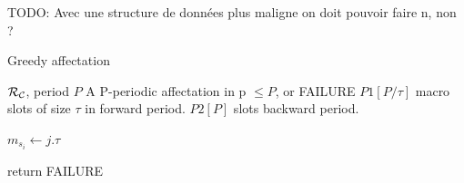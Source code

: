 \documentclass[a4paper,10pt]{article}
\newcommand{\todo}[1]{{\color{red} TODO: {#1}}}
\begin{document}
    \todo{Avec une structure de données plus maligne on doit pouvoir faire n, non ?}
	\begin{algorithm}[H]
	\caption{Greedy affectation}
	\begin{algorithmic}
	\REQUIRE ${\cal R}_{\cal C}$, period $P$
	\ENSURE A P-periodic affectation in p $\leq P$, or FAILURE
	\STATE $P1[P/\tau]$ macro slots of size $\tau$ in forward period.
	\STATE $P2[P]$ slots backward period.



	
	\STATE $m_{s_i} \leftarrow j.\tau$
	\ENDIF


	\STATE return FAILURE
	\ENDIF
	\ENDFOR

	\ENDFOR

	\end{algorithmic}
	\end{algorithm}

	
\end{document}
